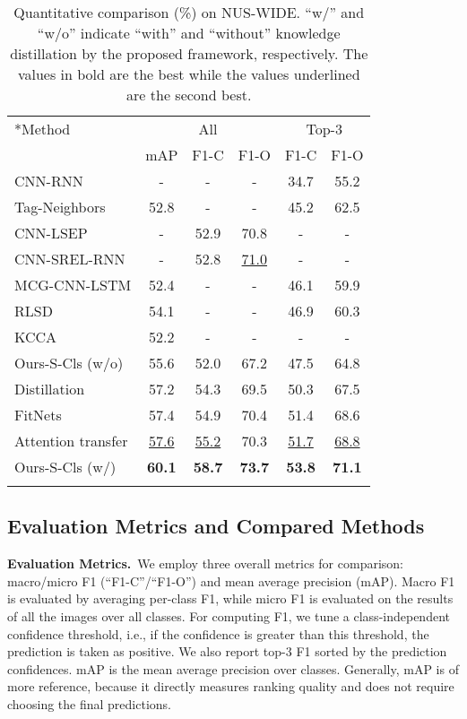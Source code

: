 \documentclass[sigconf,natbib=false]{acmart}
\begin{document}
\begin{table}[t]
  \centering
\small
  \caption{\small Quantitative comparison (\%) on NUS-WIDE. ``w/'' and ``w/o'' indicate ``with'' and ``without'' knowledge distillation by the proposed framework, respectively. The values in bold are the best while the values underlined are the second best.}
  \vspace{-5pt}
  \label{tab:nus}
  \begin{tabular}{l|ccc|cc}
  \Xhline{1.2pt}
  \multirow{2}*{Method}&\multicolumn{3}{c|}{All}&\multicolumn{2}{c}{Top-3} \\
  \cline{2-6}
  &mAP&F1-C&F1-O&F1-C&F1-O \\
  \Xhline{1.2pt}
  CNN-RNN \cite{MLIC6_cvpr16_JYJZCW}&-&-&-&34.7&55.2 \\
  Tag-Neighbors \cite{MLIC1_iccv15_JLL}&52.8&-&-&45.2&62.5 \\
  CNN-LSEP \cite{MLIC2_cvpr17_YYJ}&-&52.9&70.8&-&- \\
  CNN-SREL-RNN \cite{MLIC3_cvpr17_FTTWC}&-&52.8&\underline{71.0}&-&- \\
  MCG-CNN-LSTM \cite{MLIC22_tmm18_jqjcj}&52.4&-&-&46.1&59.9 \\
  RLSD \cite{MLIC22_tmm18_jqjcj}&54.1&-&-&46.9&60.3 \\
  KCCA \cite{MLIC19_pr17_tlla}&52.2&-&-&-&- \\
  \hline
  Ours-S-Cls (w/o)&55.6&52.0&67.2&47.5&64.8 \\
Distillation \cite{KD1_nips15_goj}&57.2&54.3&69.5&50.3&67.5 \\
  FitNets \cite{KD2_iclr15_ansacy}&57.4&54.9&70.4&51.4&68.6 \\
  Attention transfer\cite{KD3_iclr17_sn}&\underline{57.6}&\underline{55.2}&70.3&\underline{51.7}&\underline{68.8} \\
  \hline
  Ours-S-Cls (w/)&\textbf{60.1}&\textbf{58.7}&\textbf{73.7}&\textbf{53.8}&\textbf{71.1} \\
  \Xhline{1.2pt}
  \end{tabular}
\end{table}
\subsection{Evaluation Metrics and Compared Methods}

\noindent \textbf{Evaluation Metrics.}\ We employ three overall metrics for comparison: macro/micro F1 (``F1-C''/``F1-O'') and mean average precision (mAP). Macro F1 is evaluated by averaging per-class F1, while micro F1 is evaluated on the results of all the images over all classes. For computing F1, we tune a class-independent confidence threshold, i.e., if the confidence is greater than this threshold, the prediction is taken as positive. We also report top-3 F1 sorted by the prediction confidences. mAP is the mean average precision over classes. Generally, mAP is of more reference, because it directly measures ranking quality and does not require choosing the final predictions.
\end{document}
